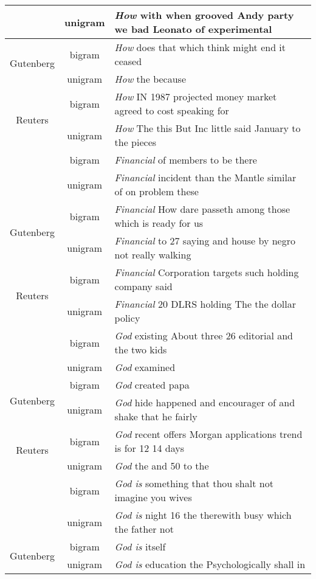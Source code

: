 \begin{tabular}{c|c|l}
   & unigram & \emph{How} with when grooved Andy party we bad Leonato of experimental \\\hline
  \multirow{2}{*}{Gutenberg} & bigram & \emph{How} does that which think might end it ceased \\\
   & unigram & \emph{How} the because \\\hline
  \multirow{2}{*}{Reuters} & bigram & \emph{How} IN 1987 projected money market agreed to cost speaking for \\
   & unigram & \emph{How} The this But Inc little said January to the pieces \\\hhline{|=|=|=|} 
  \multirow{2}{*}{Brown}  & bigram & \emph{Financial} of members to be there \\
   & unigram & \emph{Financial} incident than the Mantle similar of on problem these \\\hline
  \multirow{2}{*}{Gutenberg} & bigram & \emph{Financial} How dare passeth among those which is ready for us \\\
   & unigram & \emph{Financial} to 27 saying and house by negro not really walking \\\hline
  \multirow{2}{*}{Reuters} & bigram & \emph{Financial} Corporation targets such holding company said \\
   & unigram & \emph{Financial} 20 DLRS holding The the dollar policy \\\hhline{|=|=|=|} 
  \multirow{2}{*}{Brown}  & bigram & \emph{God} existing About three 26 editorial and the two kids  \\
   & unigram & \emph{God} examined \\\hline
  \multirow{2}{*}{Gutenberg} & bigram & \emph{God} created papa \\\
   & unigram & \emph{God} hide happened and encourager of and shake that he fairly \\\hline
  \multirow{2}{*}{Reuters} & bigram & \emph{God} recent offers Morgan applications trend is for 12 14 days \\
   & unigram & \emph{God} the and 50 to the \\\hhline{|=|=|=|} 
  \multirow{2}{*}{Brown}  & bigram & \emph{God is} something that thou shalt not imagine you wives  \\
   & unigram & \emph{God is} night 16 the therewith busy which the father not \\\hline
  \multirow{2}{*}{Gutenberg} & bigram & \emph{God is} itself \\\
   & unigram & \emph{God is} education the Psychologically shall in \\\hline

\end{tabular}
